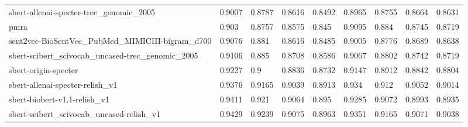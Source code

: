\begin{table}
\begin{tabular}{lllllllll}
sbert-allenai-specter-trec\_genomic\_2005          &   0.9007 &  0.8787 &  0.8616 &  0.8492 &   0.8965 &  0.8755 &  0.8664 &  0.8631 \\
pmra                                             &    0.903 &  0.8757 &  0.8575 &   0.845 &   0.9095 &   0.884 &  0.8745 &  0.8719 \\
sent2vec-BioSentVec\_PubMed\_MIMICIII-bigram\_d700  &   0.9076 &   0.881 &  0.8616 &  0.8485 &   0.9005 &  0.8776 &  0.8689 &  0.8638 \\
sbert-scibert\_scivocab\_uncased-trec\_genomic\_2005 &   0.9106 &   0.885 &  0.8708 &  0.8586 &   0.9067 &  0.8802 &  0.8742 &  0.8719 \\
sbert-origin-specter                             &   0.9227 &     0.9 &  0.8836 &  0.8732 &   0.9147 &  0.8912 &  0.8842 &  0.8804 \\
sbert-allenai-specter-relish\_v1                  &   0.9376 &  0.9165 &  0.9039 &  0.8913 &    0.934 &   0.912 &  0.9052 &  0.9014 \\
sbert-biobert-v1.1-relish\_v1                     &   0.9411 &   0.921 &  0.9064 &   0.895 &   0.9285 &  0.9072 &  0.8993 &  0.8935 \\
sbert-scibert\_scivocab\_uncased-relish\_v1         &   0.9429 &  0.9239 &  0.9075 &  0.8963 &   0.9351 &  0.9165 &  0.9071 &  0.9038 \\
\bottomrule
\end{tabular}
\end{table}


